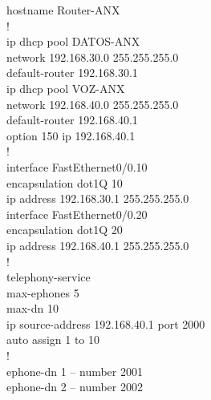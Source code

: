 \documentclass[11pt, letterpaper]{article}
\begin{document}
\begin{tcolorbox}[enhanced, breakable, colback=black!95, colframe=OroUNAM,
                  title=\textbf{Router-ANX -- Inter-VLAN Routing y Servidor de Telefonía}, arc=2mm, boxrule=1pt,
                  attach boxed title to top left={xshift=5mm, yshift=-3mm},
                  boxed title style={colback=OroUNAM},
                  fontupper=\ttfamily\small\color{white}]
hostname Router-ANX\\
!\\
ip dhcp pool DATOS-ANX\\
\hspace{1em}network 192.168.30.0 255.255.255.0\\
\hspace{1em}default-router 192.168.30.1\\
ip dhcp pool VOZ-ANX\\
\hspace{1em}network 192.168.40.0 255.255.255.0\\
\hspace{1em}default-router 192.168.40.1\\
\hspace{1em}option 150 ip 192.168.40.1\\
!\\
interface FastEthernet0/0.10\\
\hspace{1em}encapsulation dot1Q 10\\
\hspace{1em}ip address 192.168.30.1 255.255.255.0\\
interface FastEthernet0/0.20\\
\hspace{1em}encapsulation dot1Q 20\\
\hspace{1em}ip address 192.168.40.1 255.255.255.0\\
!\\
telephony-service\\
\hspace{1em}max-ephones 5\\
\hspace{1em}max-dn 10\\
\hspace{1em}ip source-address 192.168.40.1 port 2000\\
\hspace{1em}auto assign 1 to 10\\
!\\
ephone-dn 1 -- number 2001\\
ephone-dn 2 -- number 2002
\end{tcolorbox}
\end{document}
